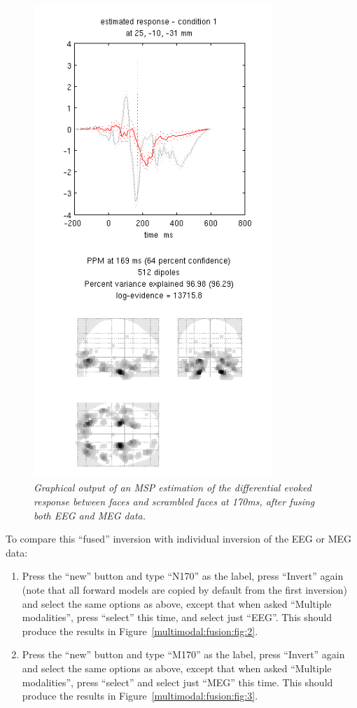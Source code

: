 \begin{figure}
\begin{center}
\includegraphics[width=90mm]{multimodal/figures/fused_eeg_meg_msp.png}
\caption{\em Graphical output of an MSP estimation of the differential evoked response between faces and scrambled faces at 170ms, after fusing both EEG and MEG data. \label{multimodal:fusion:fig:1}}
\end{center}
\end{figure}

To compare this ``fused'' inversion with individual inversion of the EEG or MEG data:

\begin{enumerate}
\item Press the ``new'' button and type ``N170'' as the label, press ``Invert'' again (note that all forward models are copied by default from the first inversion) and select the same options as above, except that when asked ``Multiple modalities'', press ``select'' this time, and select just ``EEG''. This should produce the results in Figure~\ref{multimodal:fusion:fig:2}.
\item Press the ``new'' button and type ``M170'' as the label, press ``Invert'' again and select the same options as above, except that when asked ``Multiple modalities'', press ``select'' and select just ``MEG'' this time. This should produce the results in Figure~\ref{multimodal:fusion:fig:3}.
\end{enumerate}

